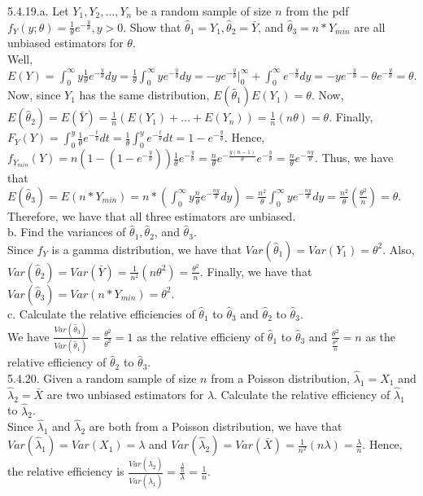 \documentclass[12pt]{article}
\begin{document}
5.4.19.a. Let $Y_1,Y_2,\ldots,Y_n$ be a random sample of size $n$ from the pdf $f_Y(y;\theta)=\frac{1}{\theta}e^{-\frac{y}{\theta}}, y>0$. Show that $\hat{\theta}_1=Y_1, \hat{\theta}_2=\bar{Y}$, and $\hat{\theta}_3=n*Y_{min}$ are all unbiased estimators for $\theta$.\\
Well, $E(Y)=\int_0^{\infty}y\frac{1}{\theta}e^{-\frac{y}{\theta}}dy=\frac{1}{\theta}\int_0^{\infty}ye^{-\frac{y}{\theta}}dy=-ye^{-\frac{y}{\theta}}|_0^{\infty}+\int_0^{\infty}e^{-\frac{y}{\theta}}dy=-ye^{-\frac{y}{\theta}}-\theta e^{-\frac{y}{\theta}}=\theta$. Now, since $Y_1$ has the same distribution, $E(\hat{\theta}_1)E(Y_1)=\theta$. Now, $E(\hat{\theta}_2)=E(\bar{Y})=\frac1n(E(Y_1)+\ldots+E(Y_n))=\frac1n(n\theta)=\theta$. Finally, $F_Y(Y)=\int_0^y\frac{1}{\theta}e^{-\frac{t}{\theta}}dt=\frac{1}{\theta}\int_0^ye^{-\frac{t}{\theta}}dt=1-e^{-\frac{y}{\theta}}.$ Hence, $f_{Y_{min}}(Y)=n(1-(1-e^{-\frac{y}{\theta}}))\frac{1}{\theta}e^{-\frac{y}{\theta}}=\frac{n}{\theta}e^{-\frac{y(n-1)}{\theta}}e^{-\frac{y}{\theta}}=\frac{n}{\theta}e^{-\frac{ny}{\theta}}$. Thus, we have that $E(\hat{\theta}_3)=E(n*Y_{min})=n*(\int_0^{\infty}y\frac{n}{\theta}e^{-\frac{ny}{\theta}}dy)=\frac{n^2}{\theta}\int_0^{\infty}ye^{-\frac{ny}{\theta}}dy=\frac{n^2}{\theta}(\frac{\theta^2}{n})=\theta$. Therefore, we have that all three estimators are unbiased.\\
b.  Find the variances of $\hat{\theta}_1, \hat{\theta}_2$, and $\hat{\theta}_3$.\\
Since $f_Y$ is a gamma distribution, we have that $Var(\hat{\theta}_1)=Var(Y_1)=\theta^2$. Also, $Var(\hat{\theta}_2)=Var(\bar{Y})=\frac{1}{n^2}(n\theta^2)=\frac{\theta^2}{n}$. Finally, we have that $Var(\hat{\theta}_3)=Var(n*Y_{min})=\theta^2$.\\
c. Calculate the relative efficiencies of $\hat{\theta}_1$ to $\hat{\theta}_3$ and $\hat{\theta}_2$ to $\hat{\theta}_3$.\\
We have $\frac{Var(\hat{\theta}_3)}{Var(\hat{\theta}_1)}=\frac{\theta^2}{\theta^2}=1$ as the relative efficieny of $\hat{\theta}_1$ to $\hat{\theta}_3$ and $\frac{\theta^2}{\frac{\theta^2}{n}}=n$ as the relative efficiency of $\hat{\theta}_2$ to $\hat{\theta}_3$.\\[20pt]

5.4.20. Given a random sample of size $n$ from a Poisson distribution, $\hat{\lambda}_1=X_1$ and $\hat{\lambda}_2=\bar{X}$ are two unbiased estimators for $\lambda$. Calculate the relative efficiency of $\hat{\lambda}_1$ to $\hat{\lambda}_2$.\\
Since $\hat{\lambda}_1$ and $\hat{\lambda}_2$ are both from a Poisson distribution, we have that $Var(\hat{\lambda}_1)=Var(X_1)=\lambda$ and $Var(\hat{\lambda}_2)=Var(\bar{X})=\frac{1}{n^2}(n\lambda)=\frac{\lambda}{n}.$ Hence, the relative efficiency is $\frac{Var(\hat{\lambda}_2)}{Var(\hat{\lambda}_1)}=\frac{\frac{\lambda}{n}}{\lambda}=\frac1n$.\\[20pt]
\end{document}
